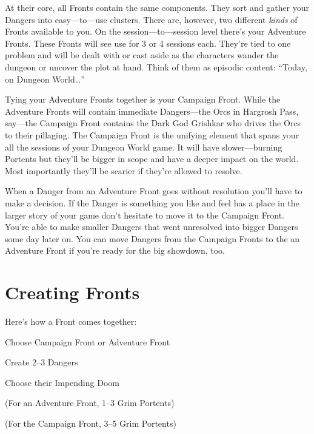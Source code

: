 At their core, all Fronts contain the same components. They sort and gather your Dangers into easy—to—use clusters. There are, however, two different {\em kinds}  of Fronts available to you. On the session—to—session level there’s your Adventure Fronts. These Fronts will see use for 3 or 4 sessions each. They’re tied to one problem and will be dealt with or cast aside as the characters wander the dungeon or uncover the plot at hand. Think of them as episodic content: “Today, on Dungeon World…”

 

Tying your Adventure Fronts together is your Campaign Front. While the Adventure Fronts will contain immediate Dangers—the Orcs in Hargrosh Pass, say—the Campaign Front contains the Dark God Grishkar who drives the Orcs to their pillaging. The Campaign Front is the unifying element that spans your all the sessions of your Dungeon World game. It will have slower—burning Portents but they’ll be bigger in scope and have a deeper impact on the world. Most importantly they'll be scarier if they're allowed to resolve.

 

When a Danger from an Adventure Front goes without resolution you’ll have to make a decision. If the Danger is something you like and feel has a place in the larger story of your game don’t hesitate to move it to the Campaign Front. You’re able to make smaller Dangers that went unresolved into bigger Dangers some day later on. You can move Dangers from the Campaign Fronts to the an Adventure Front if you’re ready for the big showdown, too.

 
\section{Creating Fronts}   
 

Here’s how a Front comes together:

 
\startitemize[1,packed]

\item Choose Campaign Front or Adventure Front

 
\item Create 2–3 Dangers

 
\item Choose their Impending Doom

 
\item (For an Adventure Front, 1–3 Grim Portents)

 
\item (For the Campaign Front, 3–5 Grim Portents)

